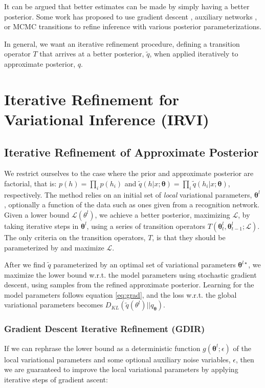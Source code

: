 \documentclass{article} %
\newcommand{\vects}[1]{\boldsymbol{#1}}
\newcommand{\TT}[0]{\vects{\theta}}
\newcommand{\LL}[0]{\mathcal{L}}
\begin{document}
It can be argued that better estimates can be made by simply having a better
posterior. Some work has proposed to use gradient descent
\citep{hoffman2013stochastic}, auxiliary networks
\citep{rezende2015variational}, or MCMC transitions \citep{icml2015_salimans15}
to refine inference with various posterior parameterizations. 

In general, we want an iterative refinement procedure, defining a transition
operator $T$ that arrives at a better posterior, $\tilde{q}$, when applied
iteratively to approximate posterior, $q$. 

\section{Iterative Refinement for Variational Inference (IRVI)}

\subsection{Iterative Refinement of Approximate Posterior}
We restrict ourselves to the case where the prior and approximate posterior are
factorial, that is: $p(h) = \prod_i p(h_i)$ and $\tilde{q}(h|x; \TT) = \prod_i
\tilde{q}(h_i|x; \TT)$, respectively. The method relies on an initial set of \emph{local} variational parameters, $\TT^l$, optionally a function of the data
such as ones given from a recognition network. Given a lower bound $\LL(\theta^l)$, we achieve a better posterior, maximizing $\LL$, by taking iterative steps 
in $\TT^l$, using a series of transition operators $T(\TT^l_t, \TT^l_{t-1}; \LL)$. 
The only criteria on the transition operators, $T$, is that they should be parameterized by and maximize $\LL$.

After we find $\tilde{q}$ parameterized by an optimal set of variational parameters $\TT^{l\star}$, we maximize the lower bound w.r.t. the model
parameters using stochastic gradient descent, using samples from the refined
approximate posterior. Learning for the model parameters follows equation \ref{eq:grad}, and the loss w.r.t. the global variational parameters becomes
$D_{KL}(\tilde{q}(\theta^l)||q_{\TT})$.

\subsubsection{Gradient Descent Iterative Refinement (GDIR)}
If we can rephrase the lower bound as a deterministic function $g(\TT^l; \epsilon)$ of the local
variational parameters and some optional auxiliary noise variables, $\epsilon$,
then we are guaranteed to improve the local variational parameters by applying iterative steps
of gradient ascent:
\end{document}

